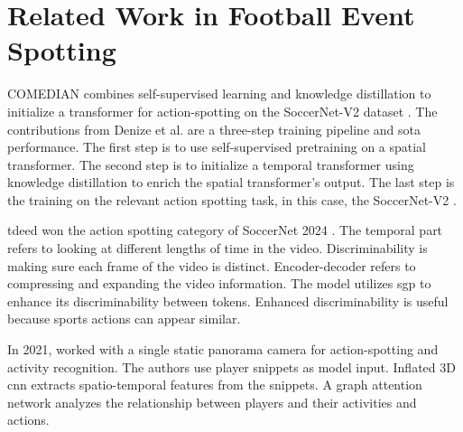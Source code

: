 \section{Related Work in Football Event Spotting}
\label{sec:fw_work}

COMEDIAN \cite{denize_comedian_2024} combines self-supervised learning and knowledge distillation to initialize a transformer for action-spotting on the SoccerNet-V2 dataset \cite{deliege_soccernet-v2_dataset_2021}. The contributions from Denize et al. are a three-step training pipeline and \acrshort{sota} performance. The first step is to use self-supervised pretraining on a spatial transformer. The second step is to initialize a temporal transformer using knowledge distillation to enrich the spatial transformer's output. The last step is the training on the relevant action spotting task, in this case, the SoccerNet-V2 \cite{deliege_soccernet-v2_dataset_2021}.

\acrfull{tdeed} \cite{xarles_t-deed_2024} won the action spotting category of SoccerNet 2024 \cite{cioppa_soccernet_2024}. The temporal part refers to looking at different lengths of time in the video. Discriminability is making sure each frame of the video is distinct. Encoder-decoder refers to compressing and expanding the video information. The model utilizes \acrfull{sgp} to enhance its discriminability between tokens. Enhanced discriminability is useful because sports actions can appear similar. 

In 2021, \textcite{gerats_individual_same_task_2021} worked with a single static panorama camera for action-spotting and activity recognition. The authors use player snippets as model input. Inflated 3D \acrshort{cnn} extracts spatio-temporal features from the snippets. A graph attention network analyzes the relationship between players and their activities and actions.





